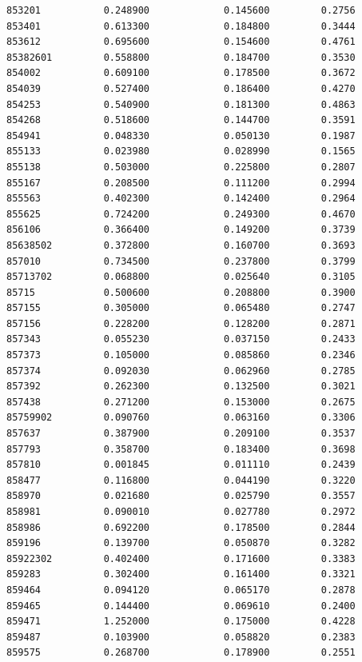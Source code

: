 \documentclass[
  letterpaper,
  DIV=11,
  numbers=noendperiod]{scrartcl}
\begin{document}
\begin{verbatim}
853201           0.248900             0.145600         0.2756
853401           0.613300             0.184800         0.3444
853612           0.695600             0.154600         0.4761
85382601         0.558800             0.184700         0.3530
854002           0.609100             0.178500         0.3672
854039           0.527400             0.186400         0.4270
854253           0.540900             0.181300         0.4863
854268           0.518600             0.144700         0.3591
854941           0.048330             0.050130         0.1987
855133           0.023980             0.028990         0.1565
855138           0.503000             0.225800         0.2807
855167           0.208500             0.111200         0.2994
855563           0.402300             0.142400         0.2964
855625           0.724200             0.249300         0.4670
856106           0.366400             0.149200         0.3739
85638502         0.372800             0.160700         0.3693
857010           0.734500             0.237800         0.3799
85713702         0.068800             0.025640         0.3105
85715            0.500600             0.208800         0.3900
857155           0.305000             0.065480         0.2747
857156           0.228200             0.128200         0.2871
857343           0.055230             0.037150         0.2433
857373           0.105000             0.085860         0.2346
857374           0.092030             0.062960         0.2785
857392           0.262300             0.132500         0.3021
857438           0.271200             0.153000         0.2675
85759902         0.090760             0.063160         0.3306
857637           0.387900             0.209100         0.3537
857793           0.358700             0.183400         0.3698
857810           0.001845             0.011110         0.2439
858477           0.116800             0.044190         0.3220
858970           0.021680             0.025790         0.3557
858981           0.090010             0.027780         0.2972
858986           0.692200             0.178500         0.2844
859196           0.139700             0.050870         0.3282
85922302         0.402400             0.171600         0.3383
859283           0.302400             0.161400         0.3321
859464           0.094120             0.065170         0.2878
859465           0.144400             0.069610         0.2400
859471           1.252000             0.175000         0.4228
859487           0.103900             0.058820         0.2383
859575           0.268700             0.178900         0.2551

\end{verbatim}
\end{document}

